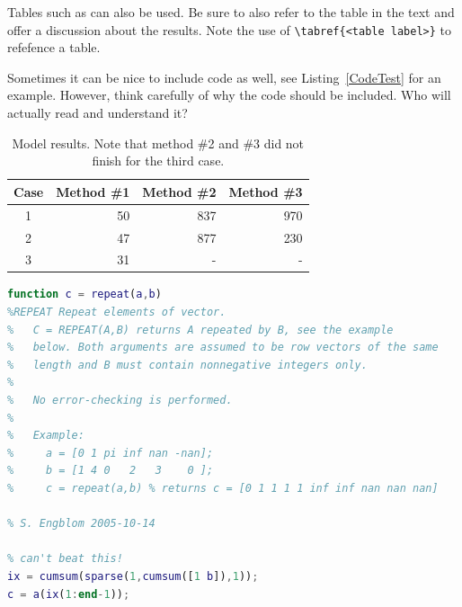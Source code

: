 Tables such as  can also be used. Be sure to also
refer to the table in the text and offer a discussion about the
results. Note the use of \verb!\tabref{<table label>}! to refefence a
table.

Sometimes it can be nice to include code as well, see
Listing~\ref{CodeTest} for an example. However, think carefully of why
the code should be included. Who will actually read and understand it?

\begin{table}[ht]
  \centering %
  \begin{tabular}{c r r r}
    Case & Method \#1 & Method \#2 & Method \#3 \\
    \hline
    1 & 50 & 837 & 970  \\
    2 & 47 & 877 & 230  \\
    3 & 31 & -  & -  \\
    \hline
  \end{tabular}
  \caption{Model results. Note that method \#2 and \#3 did not finish
    for the third case. 
    }
  \label{tab:results}
\end{table} 

\begin{lstlisting}[language = Matlab, label = CodeTest, caption =
  Sample code.]
function c = repeat(a,b)
%REPEAT Repeat elements of vector.
%   C = REPEAT(A,B) returns A repeated by B, see the example
%   below. Both arguments are assumed to be row vectors of the same
%   length and B must contain nonnegative integers only.
%
%   No error-checking is performed.
%
%   Example:
%     a = [0 1 pi inf nan -nan];
%     b = [1 4 0   2   3    0 ];
%     c = repeat(a,b) % returns c = [0 1 1 1 1 inf inf nan nan nan]

% S. Engblom 2005-10-14

% can't beat this!
ix = cumsum(sparse(1,cumsum([1 b]),1));
c = a(ix(1:end-1));
\end{lstlisting}